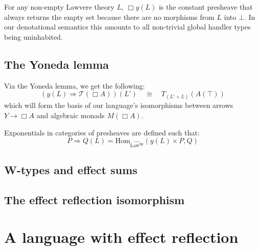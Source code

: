 \documentclass[acmsmall, screen, nonacm]{acmart}
\theoremstyle{definition}
\newcommand{\glob}{\mathop{\Box}}
\newcommand{\terminal}{\top}
\newcommand{\initial}{\bot}
\newcommand{\lawc}{\mathrm{Law}}
\newcommand{\lawcop}{\lawc^{\mathtt{op}}}
\newcommand{\pshlawcop}{\widehat{\lawcop}}
\newcommand{\yoneda}[1]{y(#1)}
\newcommand{\homset}[3]{\mathrm{Hom}_{#1}(#2, #3)}
\newcommand{\arrow}[2]{#1 \Rightarrow #2}
\newcommand{\mon}{\mathcal{T}}
\begin{document}
For any non-empty Lawvere theory $L$, $\glob \yoneda{L}$ is the constant
presheave that always returns the empty set because there are no
morphisms from $L$ into $\initial$. In our denotational semantics this
amounts to all non-trivial global handler types being uninhabited.

\subsection{The Yoneda lemma}

Via the Yoneda lemma, we get the following:
\begin{equation*}
(\arrow{\yoneda{L}}{\mon(\glob A)})(L') \quad \cong \quad T_{(L' + L)}(A(\terminal))
\end{equation*}
which will form the basis of our language's isomorphisms between arrows
$Y \rightarrow \glob A$ and algebraic monads $M(\glob A)$.

Exponentials in categories of presheaves are defined such that:
\begin{equation*}
\arrow{P}{Q}(L) = \homset{\pshlawcop}{\yoneda{L} \times P}{Q}
\end{equation*}

\subsection{W-types and effect sums}


\subsection{The effect reflection isomorphism}

\section{A language with effect reflection}
\label{sec:language}
\end{document}
